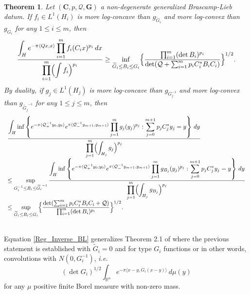 \documentclass[11pt,a4paper,reqno]{amsart}
\numberwithin{equation}{section}
\newtheorem{theorem}{Theorem}[section]
\theoremstyle{definition}
\newcommand{\ds}{\displaystyle}
\renewcommand{\tilde}{\widetilde}
\newcommand{\<}{\ensuremath \leq}
\renewcommand{\>}{\ensuremath \geq}
\renewcommand{\tilde}{\widetilde}
\begin{document}
\begin{theorem} 
    Let $(\textbf{C},p,\mathcal Q,\textbf{G})$ a non-degenerate generalized Brascamp-Lieb datum. If $f_i \in L^1(H_i)$ is more log-concave than $g_{\tilde G_i}$ and more log-convex than $g_{G_i}$ for any $1 \le i \le m$, then
    \begin{equation} \label{Reg_Inverse_BL} 
    \frac{\ds \int_H e^{-\pi\langle Qx,x\rangle}\prod_{i=1}^m f_i(C_ix)^{p_i}\, dx}{\ds \prod_{i=1}^m \Bigl ( \int f_i \Bigl)^{p_i}}\ge \inf_{\tilde G_i \le B_i \le G_i}\Bigl\{ \frac{\prod_{i=1}^m (\det B_i)^{p_i}}{\det(\mathcal Q+\sum_{i=1}^m p_iC_i^*B_iC_i)} \Bigl\}^{1/2}.\end{equation}
    By duality, if $g_j \in L^1(H_j)$ is more log-concave than $g_{G_j^{-1}}$ and more log-convex than $g_{\tilde{G_j}^{-1}}$ for any $1 \le j \le m$, then $$\begin{array}{lll}
    \ds \frac{\ds \int_H \inf \left\{e^{-\pi \langle \mathcal Q_+^{-1}y_0,y_0\rangle}e^{\pi \langle \mathcal{Q}_-^{-1} y_{m+1},y_{m+1} \rangle} \prod_{j=1}^m g_j(y_j)^{p_j} : \sum_{j=0}^{m+1} p_jC_j^*y_j=y \right\}\, dy}{\ds \prod_{j=1}^m \Bigl( \int_{H_j}g_j\Bigl)^{p_j}} \\ 
    \ds \le \sup_{G_i^{-1} \le B_i \le \tilde{G_i}^{-1}} \frac{\ds \int_H \inf \left\{e^{-\pi \langle \mathcal Q_+^{-1}y_0,y_0\rangle}e^{\pi \langle \mathcal{Q}_-^{-1} y_{m+1},y_{m+1} \rangle} \prod_{j=1}^m g_{B_j}(y_j)^{p_j} : \sum_{j=0}^{m+1} p_jC_j^*y_j=y \right\}\, dy}{\ds \prod_{j=1}^m \Bigl( \int_{H_j}g_{B_j}\Bigl)^{p_j}} \\
    \ds \le \sup_{\tilde G_i \le B_i \le G_i} \Bigl\{ \frac{\det(\sum_{i=1}^m p_iC_i^*B_iC_i+\mathcal Q)}{\prod_{i=1}^m (\det B_i)^{p_i}} \Bigl\}^{1/2}.
    \end{array}$$ 
\end{theorem}

\hfill \\

Equation \cref{Reg_Inverse_BL} generalizes Theorem 2.1 of \cite{Nakamura} where the previous statement is established with $\tilde G_i=0$ and for type $G_i$ functions or in other words, convolutions with $N(0,G_i^{-1})$, \textit{i.e.} $$(\det G_i)^{1/2}\int_{\mathbb{R}^n}e^{-\pi \langle x-y,G_i(x-y)\rangle}\, d\mu(y)$$ for any $\mu$ positive finite Borel measure with non-zero mass. 
   




\hfill \\
\end{document}
